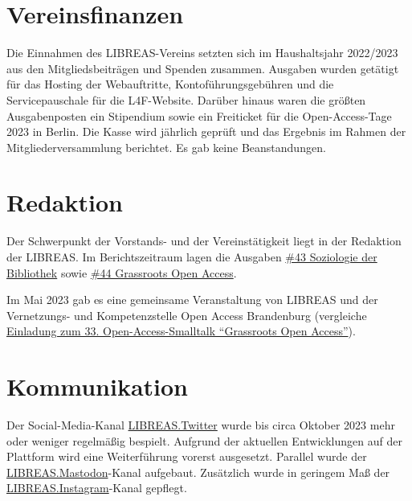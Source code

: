 \documentclass[a4paper,
fontsize=11pt,
oneside,
numbers=noperiodatend,
parskip=half-,
bibliography=totoc,
final
]{scrartcl}
\begin{document}
\hypertarget{vereinsfinanzen}{%
\section{Vereinsfinanzen}\label{vereinsfinanzen}}

Die Einnahmen des LIBREAS-Vereins setzten sich im Haushaltsjahr
2022/2023 aus den Mitgliedsbeiträgen und Spenden zusammen. Ausgaben
wurden getätigt für das Hosting der Webauftritte, Kontoführungsgebühren
und die Servicepauschale für die L4F-Website. Darüber hinaus waren die
größten Ausgabenposten ein Stipendium sowie ein Freiticket für die
Open-Access-Tage 2023 in Berlin. Die Kasse wird jährlich geprüft und das
Ergebnis im Rahmen der Mitgliederversammlung berichtet. Es gab keine
Beanstandungen.

\hypertarget{redaktion}{%
\section{Redaktion}\label{redaktion}}

Der Schwerpunkt der Vorstands- und der Vereinstätigkeit liegt in der
Redaktion der LIBREAS. Im Berichtszeitraum lagen die Ausgaben
\href{https://libreas.eu/ausgabe43/inhalt/}{\#43 Soziologie der
Bibliothek} sowie
\href{https://libreas.wordpress.com/2023/05/04/cfp-44-grassroots-open-access/}{\#44
Grassroots Open Access}.

Im Mai 2023 gab es eine gemeinsame Veranstaltung von LIBREAS und der
Vernetzungs- und Kompetenzstelle Open Access Brandenburg (vergleiche
\href{https://open-access-brandenburg.de/einladung-zum-33-open-access-smalltalk-grass-roots-open-access-gemeinsam-mit-libreas-e-v/}{Einladung
zum 33. Open-Access-Smalltalk \enquote{Grassroots Open Access}}).

\hypertarget{kommunikation}{%
\section{Kommunikation}\label{kommunikation}}

Der Social-Media-Kanal
\href{https://twitter.com/libreas}{LIBREAS.Twitter} wurde bis circa
Oktober 2023 mehr oder weniger regelmäßig bespielt. Aufgrund der
aktuellen Entwicklungen auf der Plattform wird eine Weiterführung
vorerst ausgesetzt. Parallel wurde der
\href{https://openbiblio.social/@libreas}{LIBREAS.Mastodon}-Kanal
aufgebaut. Zusätzlich wurde in geringem Maß der
\href{https://www.instagram.com/libreas.libraryideas/}{LIBREAS.Instagram}-Kanal
gepflegt.
\end{document}
